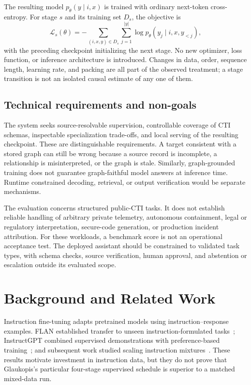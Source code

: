 \documentclass[journal]{IEEEtran}
\begin{document}
The resulting model $p_\theta(y\mid i,x)$ is trained with ordinary next-token cross-entropy. For stage $s$ and its training set $D_s$, the objective is
\begin{equation}
 \mathcal{L}_s(\theta)=-\sum_{(i,x,y)\in D_s}\sum_{j=1}^{|y|}
 \log p_\theta(y_j\mid i,x,y_{<j}),
\end{equation}
with the preceding checkpoint initializing the next stage. No new optimizer, loss function, or inference architecture is introduced. Changes in data, order, sequence length, learning rate, and packing are all part of the observed treatment; a stage transition is not an isolated causal estimate of any one of them.

\subsection{Technical requirements and non-goals}
The system seeks source-resolvable supervision, controllable coverage of CTI schemas, inspectable specialization trade-offs, and local serving of the resulting checkpoint. These are distinguishable requirements. A target consistent with a stored graph can still be wrong because a source record is incomplete, a relationship is misinterpreted, or the graph is stale. Similarly, graph-grounded training does not guarantee graph-faithful model answers at inference time. Runtime constrained decoding, retrieval, or output verification would be separate mechanisms.

The evaluation concerns structured public-CTI tasks. It does not establish reliable handling of arbitrary private telemetry, autonomous containment, legal or regulatory interpretation, secure-code generation, or production incident attribution. For these workloads, a benchmark score is not an operational acceptance test. The deployed assistant should be constrained to validated task types, with schema checks, source verification, human approval, and abstention or escalation outside its evaluated scope.

\section{Background and Related Work}\label{sec:related}
Instruction fine-tuning adapts pretrained models using instruction--response examples. FLAN established transfer to unseen instruction-formulated tasks~\cite{wei2022flan}; InstructGPT combined supervised demonstrations with preference-based training~\cite{ouyang2022instructgpt}; and subsequent work studied scaling instruction mixtures~\cite{chung2024flant5}. These results motivate investment in instruction data, but they do not prove that Glaukopis's particular four-stage supervised schedule is superior to a matched mixed-data run.
\end{document}
